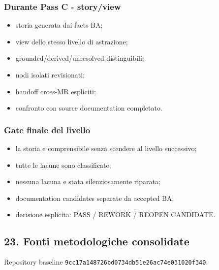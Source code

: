 \documentclass[
  9pt,
  a4paper,
]{article}
\providecommand{\tightlist}{%
  \setlength{\itemsep}{0pt}\setlength{\parskip}{0pt}}
\begin{document}
\subsubsection{Durante Pass C -
story/view}\label{durante-pass-c---storyview}

\begin{itemize}
\tightlist
\item[$\square$]
  storia generata dai facts BA;
\item[$\square$]
  view dello stesso livello di astrazione;
\item[$\square$]
  grounded/derived/unresolved distinguibili;
\item[$\square$]
  nodi isolati revisionati;
\item[$\square$]
  handoff cross-MR espliciti;
\item[$\square$]
  confronto con source documentation completato.
\end{itemize}

\subsubsection{Gate finale del livello}\label{gate-finale-del-livello}

\begin{itemize}
\tightlist
\item[$\square$]
  la storia e comprensibile senza scendere al livello successivo;
\item[$\square$]
  tutte le lacune sono classificate;
\item[$\square$]
  nessuna lacuna e stata silenziosamente riparata;
\item[$\square$]
  documentation candidates separate da accepted BA;
\item[$\square$]
  decisione esplicita: PASS / REWORK / REOPEN CANDIDATE.
\end{itemize}

\subsection{23. Fonti metodologiche
consolidate}\label{fonti-metodologiche-consolidate}

Repository baseline \texttt{9cc17a148726bd0734db51e26ac74e031020f340}:
\end{document}
